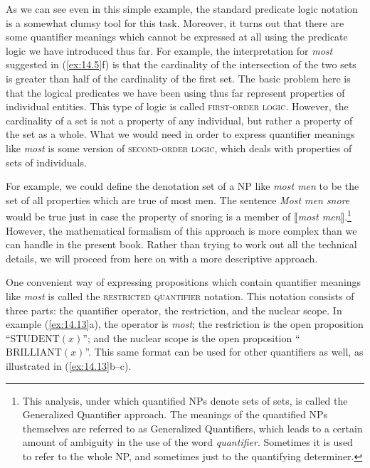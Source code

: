 As we can see even in this simple example, the standard predicate logic notation is a somewhat clumsy tool for this task. Moreover, it turns out that there are some quantifier meanings which cannot be expressed at all using the predicate logic we have introduced thus far. For example, the interpretation for \textit{most} suggested in (\ref{ex:14.5}f) is that the cardinality of the intersection of the two sets is greater than half of the cardinality of the first set. The basic problem here is that the logical predicates we have been using thus far represent properties of individual entities. This type of logic is called \textsc{first-order logic}. However, the cardinality of a set is not a property of any individual, but rather a property of the set as a whole. What we would need in order to express quantifier meanings like \textit{most} is some version of \textsc{second-order logic}, which deals with properties of sets of individuals.



For example, we could define the denotation set of a NP like \textit{most men} to be the set of all properties which are true of most men. The sentence \textit{Most men snore} would be true just in case the property of snoring is a member of $\llbracket$\textit{most men}$\rrbracket$.\footnote{This analysis, under which quantified NPs denote sets of sets, is called the Generalized Quantifier approach. The meanings of the quantified NPs themselves are referred to as Generalized Quantifiers, which leads to a certain amount of ambiguity in the use of the word \textit{quantifier}. Sometimes it is used to refer to the whole NP, and sometimes just to the quantifying determiner.} However, the mathematical formalism of this approach is more complex than we can handle in the present book. Rather than trying to work out all the technical details, we will proceed from here on with a more descriptive approach.


\begin{sloppypar}
One convenient way of expressing propositions which contain quantifier meanings like \textit{most} is called the \textsc{restricted quantifier} notation. This notation consists of three parts: the quantifier operator, the restriction, and the nuclear scope. In example (\ref{ex:14.13}a), the operator is \textit{most}; the restriction is the open proposition “$\text{STUDENT}(x)$”; and the nuclear scope is the open proposition “$\text{BRILLIANT}(x)$”. This same format can be used for other quantifiers as well, as illustrated in (\ref{ex:14.13}b--c).
\end{sloppypar}



